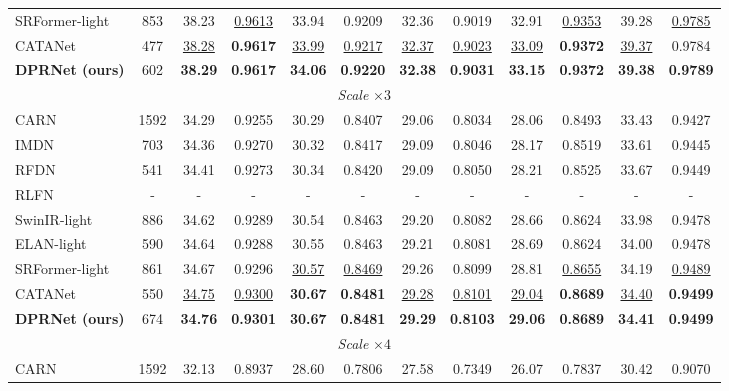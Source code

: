\begin{table}[H]
\begin{tabular*}{\textwidth}{@{\extracolsep{\fill}}lccccccccccc}
SRFormer-light  & 853  & 38.23 & \underline{0.9613} & 33.94 & 0.9209 & 32.36 & 0.9019 & 32.91 & \underline{0.9353} & 39.28 & \underline{0.9785} \\
CATANet         & 477  & \underline{38.28} & \textbf{0.9617} & \underline{33.99} & \underline{0.9217} & \underline{32.37} & \underline{0.9023} & \underline{33.09} & \textbf{0.9372} & \underline{39.37} & 0.9784 \\
\textbf{DPRNet (ours)} & 602 & \textbf{38.29} & \textbf{0.9617} & \textbf{34.06} & \textbf{0.9220} & \textbf{32.38} & \textbf{0.9031} & \textbf{33.15} & \textbf{0.9372} & \textbf{39.38} & \textbf{0.9789} \\
\midrule
\multicolumn{12}{c}{\textit{Scale} $\times 3$} \\
\midrule
CARN            & 1592 & 34.29 & 0.9255 & 30.29 & 0.8407 & 29.06 & 0.8034 & 28.06 & 0.8493 & 33.43 & 0.9427 \\
IMDN            & 703  & 34.36 & 0.9270 & 30.32 & 0.8417 & 29.09 & 0.8046 & 28.17 & 0.8519 & 33.61 & 0.9445 \\
RFDN            & 541  & 34.41 & 0.9273 & 30.34 & 0.8420 & 29.09 & 0.8050 & 28.21 & 0.8525 & 33.67 & 0.9449 \\
RLFN            & -    & -     & -      & -     & -      & -     & -      & -     & -      & -     & -      \\
SwinIR-light    & 886  & 34.62 & 0.9289 & 30.54 & 0.8463 & 29.20 & 0.8082 & 28.66 & 0.8624 & 33.98 & 0.9478 \\
ELAN-light      & 590  & 34.64 & 0.9288 & 30.55 & 0.8463 & 29.21 & 0.8081 & 28.69 & 0.8624 & 34.00 & 0.9478 \\
SRFormer-light  & 861  & 34.67 & 0.9296 & \underline{30.57} & \underline{0.8469} & 29.26 & 0.8099 & 28.81 & \underline{0.8655} & 34.19 & \underline{0.9489} \\
CATANet         & 550  & \underline{34.75} & \underline{0.9300} & \textbf{30.67} & \textbf{0.8481} & \underline{29.28} & \underline{0.8101} & \underline{29.04} & \textbf{0.8689} & \underline{34.40} & \textbf{0.9499} \\
\textbf{DPRNet (ours)} & 674 & \textbf{34.76} & \textbf{0.9301} & \textbf{30.67} & \textbf{0.8481} & \textbf{29.29} & \textbf{0.8103} & \textbf{29.06} & \textbf{0.8689} & \textbf{34.41} & \textbf{0.9499} \\
\midrule
\multicolumn{12}{c}{\textit{Scale} $\times 4$} \\
\midrule
CARN            & 1592 & 32.13 & 0.8937 & 28.60 & 0.7806 & 27.58 & 0.7349 & 26.07 & 0.7837 & 30.42 & 0.9070 \\

\end{tabular*}
\end{table}
